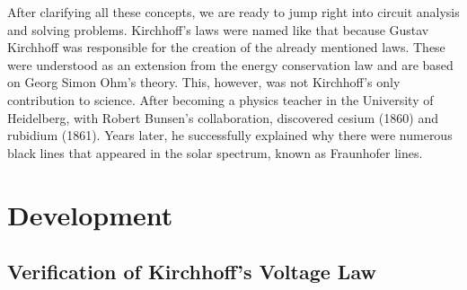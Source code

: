 \documentclass[a4paper]{article}
\begin{document}
After clarifying all these concepts, we are ready to jump right into circuit analysis and solving problems.
Kirchhoff's laws were named like that because Gustav Kirchhoff was responsible for the creation of the already mentioned laws. These were understood as an extension from the energy conservation law and are based on Georg Simon Ohm's theory. This, however, was not Kirchhoff's only contribution to science. After becoming a physics teacher in the University of Heidelberg, with Robert Bunsen's collaboration, discovered cesium (1860) and rubidium (1861). Years later, he successfully explained why there were numerous black lines that appeared in the solar spectrum, known as Fraunhofer lines.

\newpage
\section{Development}
\subsection{Verification of Kirchhoff's Voltage Law}
\end{document}
